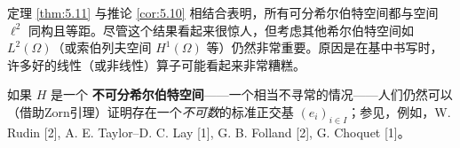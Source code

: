 \begin{remark}
定理 \ref{thm:5.11} 与推论 \ref{cor:5.10} 相结合表明，所有可分希尔伯特空间都与空间 $\ell^2$ 同构且等距。尽管这个结果看起来很惊人，但考虑其他希尔伯特空间如 $L^2(\Omega)$（或索伯列夫空间 $H^1(\Omega)$ 等）仍然非常重要。原因是在基中书写时，许多好的线性（或非线性）算子可能看起来非常糟糕。
\end{remark}

\begin{remark}
如果 $H$ 是一个 \textbf{不可分希尔伯特空间}——一个相当不寻常的情况——人们仍然可以（借助Zorn引理）证明存在一个\textit{不可数}的标准正交基 $(e_i)_{i \in I}$；参见，例如，W. Rudin [2], A. E. Taylor--D. C. Lay [1], G. B. Folland [2], G. Choquet [1]。
\end{remark}
